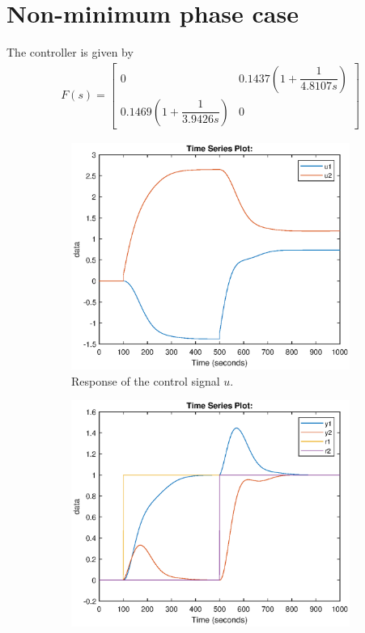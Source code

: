 \documentclass[11pt,a4paper]{article}
\begin{document}
\section*{Non-minimum phase case}
\par The controller is given by
\begin{align*}
	F(s) = \begin{bmatrix}
		0 & 0.1437(1+\dfrac{1}{4.8107s}) \\
		0.1469(1+\dfrac{1}{3.9426s}) & 0    	
    \end{bmatrix}
\end{align*}
\begin{figure}[!ht]
	\footnotesize
	\centering 
	\begin{subfigure}[t]{.495\linewidth}
		\includegraphics[width=\columnwidth]{3331}
		\caption{Response of the control signal $u$.}
		\label{fig:3331}
	\end{subfigure}
	\begin{subfigure}[t]{.495\linewidth}
		\includegraphics[width=\columnwidth]{3332}

\end{subfigure}
\end{figure}
\end{document}

